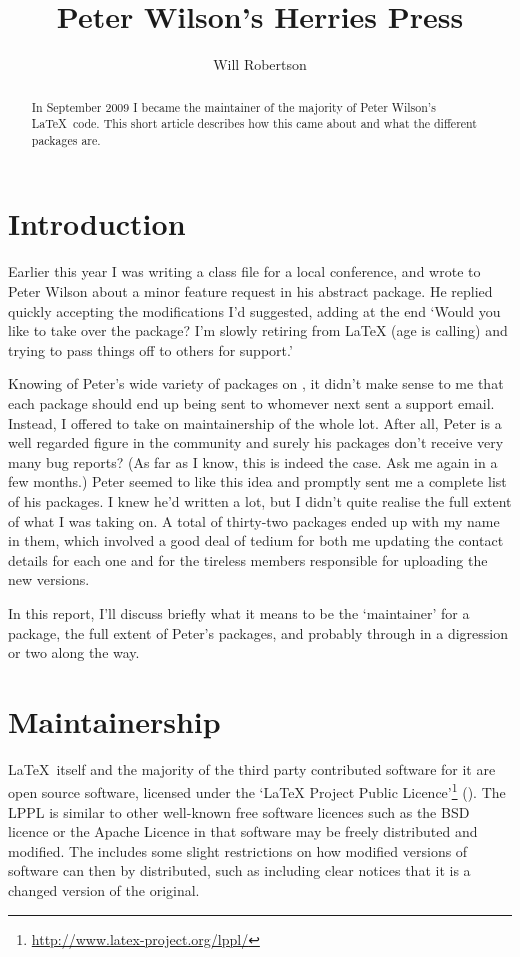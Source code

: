 \documentclass{ltugboat}
\title{Peter Wilson's Herries Press}
\author{Will Robertson}
\begin{document}
\maketitle
\begin{abstract}
In September 2009 I became the maintainer of the majority of Peter Wilson's \LaTeX\ code. This short article describes how this came about and what the different packages are.
\end{abstract}

\section{Introduction}

Earlier this year I was writing a class file for a local conference, and wrote to Peter Wilson about a minor feature request in his \textsf{abstract} package. He replied quickly accepting the modifications I'd suggested, adding at the end `Would you like to take over the package? I'm slowly retiring from LaTeX (age is calling) and trying to pass things off to others for support.'

Knowing of Peter's wide variety of packages on , it didn't make sense to me that each package should end up being sent to whomever next sent a support email. Instead, I offered to take on maintainership of the whole lot. After all, Peter is a well regarded figure in the community and surely his packages don't receive very many bug reports? (As far as I know, this is indeed the case. Ask me again in a few months.) Peter seemed to like this idea and promptly sent me a complete list of his packages. I knew he'd written a lot, but I didn't quite realise the full extent of what I was taking on. A total of thirty-two packages ended up with my name in them, which involved a good deal of tedium for both me updating the contact details for each one and for the tireless  members responsible for uploading the new versions.

In this report, I'll discuss briefly what it means to be the `maintainer' for a package, the full extent of Peter's packages, and probably through in a digression or two along the way.

\section{Maintainership}

\LaTeX\ itself and the majority of the third party contributed software for it are open source software, licensed under the `LaTeX Project Public Licence'\footnote{\url{http://www.latex-project.org/lppl/}} (). The LPPL is similar to other well-known free software licences such as the BSD licence or the Apache Licence in that software may be freely distributed and modified. The  includes some slight restrictions on how modified versions of software can then by distributed, such as including clear notices that it is a changed version of the original.
\end{document}
